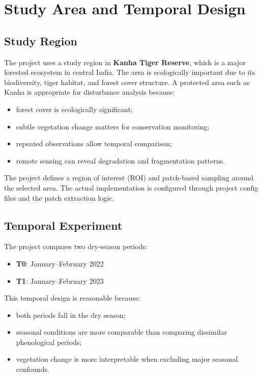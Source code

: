 \documentclass[11pt]{article}
\begin{document}
\section{Study Area and Temporal Design}

\subsection{Study Region}
The project uses a study region in \textbf{Kanha Tiger Reserve}, which is a major forested ecosystem in central India. The area is ecologically important due to its biodiversity, tiger habitat, and forest cover structure. A protected area such as Kanha is appropriate for disturbance analysis because:
\begin{itemize}
    \item forest cover is ecologically significant;
    \item subtle vegetation change matters for conservation monitoring;
    \item repeated observations allow temporal comparison;
    \item remote sensing can reveal degradation and fragmentation patterns.
\end{itemize}

The project defines a region of interest (ROI) and patch-based sampling around the selected area. The actual implementation is configured through project config files and the patch extraction logic.

\subsection{Temporal Experiment}
The project compares two dry-season periods:
\begin{itemize}
    \item \textbf{T0}: January--February 2022
    \item \textbf{T1}: January--February 2023
\end{itemize}

This temporal design is reasonable because:
\begin{itemize}
    \item both periods fall in the dry season;
    \item seasonal conditions are more comparable than comparing dissimilar phenological periods;
    \item vegetation change is more interpretable when excluding major seasonal confounds.
\end{itemize}
\end{document}
